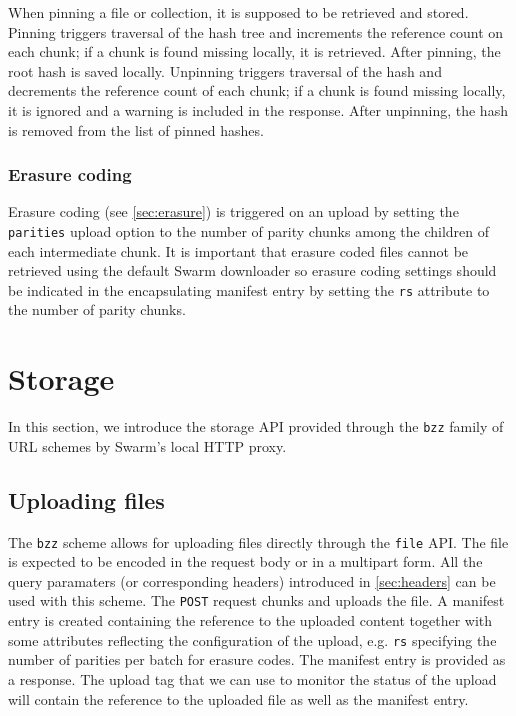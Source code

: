 When pinning a file or collection, it is supposed to be retrieved and stored. Pinning triggers traversal of the hash tree and increments the reference count on each chunk; if a chunk is found missing locally, it is retrieved. After pinning, the root hash is saved locally. Unpinning triggers traversal of the hash and decrements the reference count of each chunk; if a chunk is found missing locally, it is ignored and a warning is included in the response. After unpinning, the hash is removed from the list of pinned hashes. 



\subsubsection{Erasure coding}

Erasure coding (see \ref{sec:erasure}) is triggered on an upload by setting the \lstinline{parities} upload option to the number of parity chunks among the children of each intermediate chunk. It is important that erasure coded files cannot be retrieved using the default Swarm downloader so erasure coding settings should be indicated in the encapsulating manifest entry by setting the \lstinline{rs} attribute to the number of parity chunks. 

\section{Storage \statusgreen}\label{sec:storage-ux}

\green{}


In this section, we introduce the storage API provided through the \lstinline{bzz} family of URL schemes by Swarm's local HTTP proxy.

\subsection{Uploading files \statusgreen}\label{sec:file-api}

The \lstinline{bzz} scheme allows for uploading files directly through the \lstinline{file} API. The file is expected to be encoded in the request body or in a multipart form. All the query paramaters (or corresponding headers)  introduced in \ref{sec:headers} can be used with this scheme. The \lstinline{POST} request chunks and uploads the file. A manifest entry is created containing the reference to the uploaded content together with some attributes reflecting the configuration of the upload, e.g. \lstinline{rs} specifying the number of parities per batch for erasure codes.
The manifest entry is provided as a response. The upload tag that we can use to monitor the status of the upload will contain the reference to the uploaded file as well as the manifest entry.

